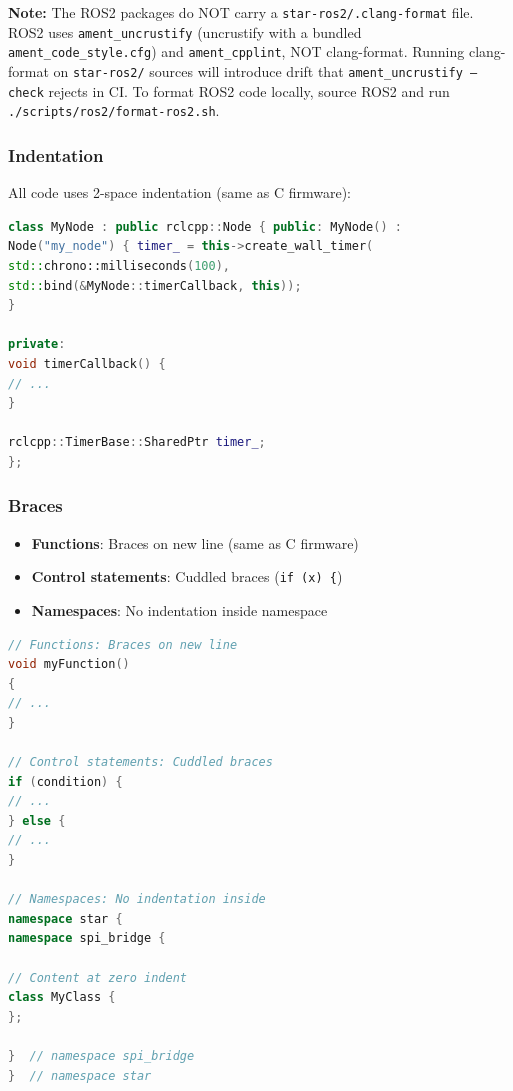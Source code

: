 \textbf{Note:} The ROS2 packages do NOT carry a \texttt{star-ros2/.clang-format}
file. ROS2 uses \texttt{ament\_uncrustify} (uncrustify with a bundled
\texttt{ament\_code\_style.cfg}) and \texttt{ament\_cpplint}, NOT clang-format.
Running clang-format on \texttt{star-ros2/} sources will introduce drift that
\texttt{ament\_uncrustify --check} rejects in CI. To format ROS2 code locally,
source ROS2 and run \texttt{./scripts/ros2/format-ros2.sh}.

\subsubsection{Indentation}

All code uses 2-space indentation (same as C firmware):

\begin{lstlisting}[language=C++, caption={Indentation example},
label={lst:indentation}]
class MyNode : public rclcpp::Node { public: MyNode() :
Node("my_node") { timer_ = this->create_wall_timer(
std::chrono::milliseconds(100),
std::bind(&MyNode::timerCallback, this));
}

private:
void timerCallback() {
// ...
}

rclcpp::TimerBase::SharedPtr timer_;
};
\end{lstlisting}

\subsubsection{Braces}

\begin{itemize}
\item \textbf{Functions}: Braces on new line (same as C firmware)
\item \textbf{Control statements}: Cuddled braces (\texttt{if (x) \{})
\item \textbf{Namespaces}: No indentation inside namespace
\end{itemize}

\begin{lstlisting}[language=C++, caption={Brace style examples},
label={lst:braces}]
// Functions: Braces on new line
void myFunction()
{
// ...
}

// Control statements: Cuddled braces
if (condition) {
// ...
} else {
// ...
}

// Namespaces: No indentation inside
namespace star {
namespace spi_bridge {

// Content at zero indent
class MyClass {
};

}  // namespace spi_bridge
}  // namespace star
\end{lstlisting}

